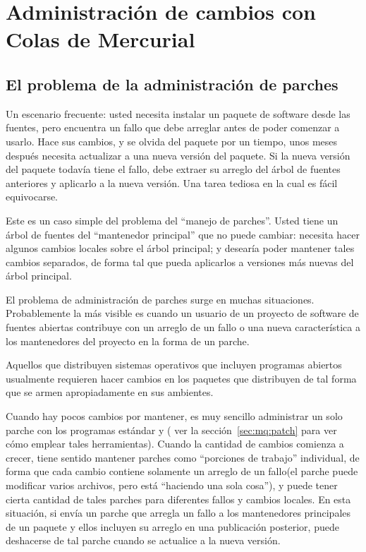 \chapter{Administración de cambios con Colas de Mercurial}
\label{chap:mq}

\section{El problema de la administración de parches}
\label{sec:mq:patch-mgmt}

Un escenario frecuente: usted necesita instalar un paquete de software
desde las fuentes, pero encuentra un fallo que debe arreglar antes de
poder comenzar a usarlo.  Hace sus cambios, y se olvida del paquete
por un tiempo, unos meses después necesita actualizar a una nueva
versión del paquete.  Si la nueva versión del paquete todavía tiene el
fallo, debe extraer su arreglo del árbol de fuentes anteriores y
aplicarlo a la nueva versión.  Una tarea tediosa en la cual es fácil
equivocarse.

Este es un caso simple del problema del ``manejo de parches''.  Usted
tiene un árbol de fuentes del ``mantenedor principal'' que no puede
cambiar: necesita hacer algunos cambios locales sobre el árbol
principal; y desearía poder mantener tales cambios separados, de forma
tal que pueda aplicarlos a versiones más nuevas del árbol principal.

El problema de administración de parches surge en muchas situaciones.
Probablemente la más visible es cuando un usuario de un proyecto de
software de fuentes abiertas contribuye con un arreglo de un fallo o
una nueva característica a los mantenedores del proyecto en la forma
de un parche.

Aquellos que distribuyen sistemas operativos que incluyen programas
abiertos usualmente requieren hacer cambios en los paquetes que
distribuyen de tal forma que se armen apropiadamente en sus ambientes.

Cuando hay pocos cambios por mantener, es muy sencillo administrar un
solo parche con los programas estándar  y
( ver la sección~\ref{sec:mq:patch} para ver cómo
emplear tales herramientas). Cuando la cantidad de cambios comienza a
crecer, tiene sentido mantener parches como ``porciones de trabajo''
individual, de forma que cada cambio contiene solamente un arreglo de
un fallo(el parche puede modificar varios archivos, pero está
``haciendo una sola cosa''), y puede tener cierta cantidad de tales
parches para diferentes fallos y cambios locales.  En esta situación,
si envía un parche que arregla un fallo a los mantenedores principales
de un paquete y ellos incluyen su arreglo en una publicación
posterior, puede deshacerse de tal parche cuando se actualice a la
nueva versión.


